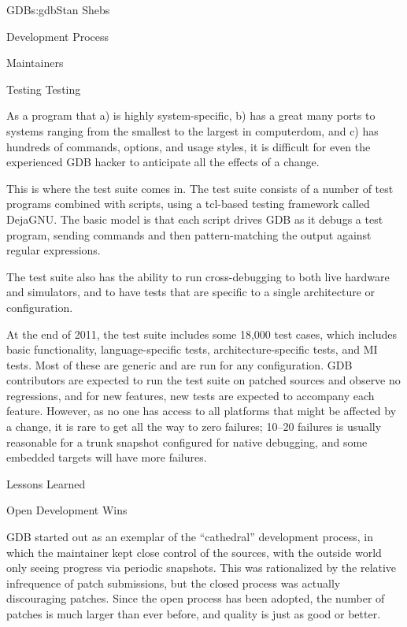 \begin{aosachapter}{GDB}{s:gdb}{Stan Shebs}
\begin{aosasect1}{Development Process}
\begin{aosasect2}{Maintainers}
\end{aosasect2}

\begin{aosasect2}{Testing Testing}

As a program that a) is highly system-specific, b) has a great many
ports to systems ranging from the smallest to the largest in
computerdom, and c) has hundreds of commands, options, and usage
styles, it is difficult for even the experienced GDB hacker to
anticipate all the effects of a change.

This is where the test suite comes in.  The test suite consists of a
number of test programs combined with  scripts, using a
tcl-based testing framework called DejaGNU.  The basic model is that
each script drives GDB as it debugs a test program, sending commands and
then pattern-matching the output against regular expressions.

The test suite also has the ability to run cross-debugging to both live
hardware and simulators, and to have tests that are specific to a
single architecture or configuration.

At the end of 2011, the test suite includes some 18,000 test cases,
which includes basic functionality, language-specific tests,
architecture-specific tests, and MI tests.  Most of these are generic
and are run for any configuration.  GDB contributors are expected to
run the test suite on patched sources and observe no regressions, and
for new features, new tests are expected to accompany each feature.
However, as no one has access to all platforms that might be affected
by a change, it is rare to get all the way to zero failures; 10--20
failures is usually reasonable for a trunk snapshot configured for
native debugging, and some embedded targets will have more failures.

\end{aosasect2}

\end{aosasect1}

\begin{aosasect1}{Lessons Learned}

\begin{aosasect2}{Open Development Wins}

GDB started out as an exemplar of the ``cathedral'' development
process, in which the maintainer kept close control of the sources,
with the outside world only seeing progress via periodic snapshots.
This was rationalized by the relative infrequence of patch submissions,  
but the closed process was actually discouraging patches. Since
the open process has been adopted, the number of patches is much
larger than ever before, and quality is just as good or better.


\end{aosasect2}
\end{aosasect1}
\end{aosachapter}
